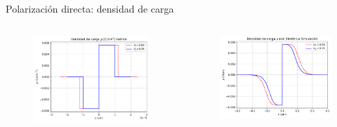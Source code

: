 \documentclass[aspectratio=169,xcolor=dvipsnames]{beamer}
\begin{document}
\begin{frame}{Polarización directa: densidad de carga}
    \begin{columns}
        \begin{column}{0.5\textwidth}
            \begin{figure}
                \includegraphics[width=0.90\linewidth]{Teorico/Densidad_Carga-Directa.pdf}
            \end{figure}
        \end{column}
        \begin{column}{0.5\textwidth}
            \begin{figure}
                \includegraphics[width=0.90\linewidth]{Directa/Densidad_Carga-Directa.pdf}
            \end{figure}
        \end{column}
        \end{columns}

\end{frame}
\end{document}
